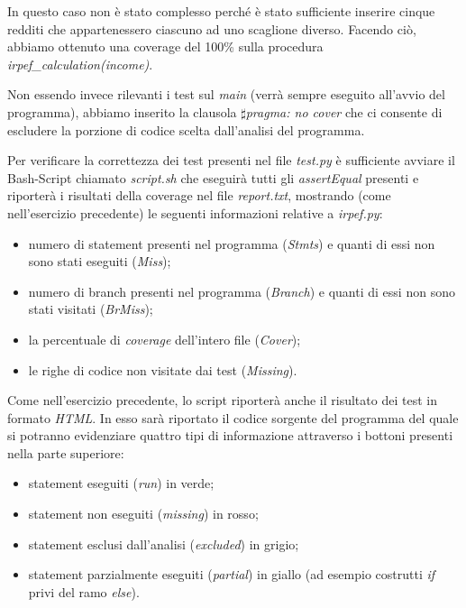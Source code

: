 \documentclass[a4paper, 12pt]{article}
\begin{document}
	In questo caso non è stato complesso perché è stato sufficiente inserire cinque redditi che appartenessero ciascuno ad uno scaglione diverso. Facendo ciò, abbiamo ottenuto una coverage del 100\% sulla procedura \textit{irpef\_calculation(income)}.
	
	Non essendo invece rilevanti i test sul \textit{main} (verrà sempre eseguito all'avvio del programma), abbiamo inserito la clausola \textit{$\sharp$pragma: no cover} che ci consente di escludere la porzione di codice scelta dall'analisi del programma.
	
	Per verificare la correttezza dei test presenti nel file \textit{test.py} è sufficiente avviare il Bash-Script chiamato \textit{script.sh} che eseguirà tutti gli \textit{assertEqual} presenti e riporterà i risultati della coverage nel file \textit{report.txt}, mostrando (come nell'esercizio precedente) le seguenti informazioni relative a \textit{irpef.py}:
	\begin{itemize}
		\item numero di statement presenti nel programma (\textit{Stmts}) e quanti di essi non sono stati eseguiti (\textit{Miss});
		\item numero di branch presenti nel programma (\textit{Branch}) e quanti di essi non sono stati visitati (\textit{BrMiss});
		\item la percentuale di \textit{coverage} dell'intero file (\textit{Cover});
		\item le righe di codice non visitate dai test (\textit{Missing}).
		
	\end{itemize}
	
	\noindent
	Come nell'esercizio precedente, lo script riporterà anche il risultato dei test in formato \textit{HTML}. In esso sarà riportato il codice sorgente del programma del quale si potranno evidenziare quattro tipi di informazione attraverso i bottoni presenti nella parte superiore:
	\begin{itemize}
		\item statement eseguiti (\textit{run}) in verde;
		\item statement non eseguiti (\textit{missing}) in rosso;
		\item statement esclusi dall'analisi (\textit{excluded}) in grigio;
		\item statement parzialmente eseguiti (\textit{partial}) in giallo (ad esempio costrutti \textit{if} privi del ramo \textit{else}).
	\end{itemize}
	
\end{document}
